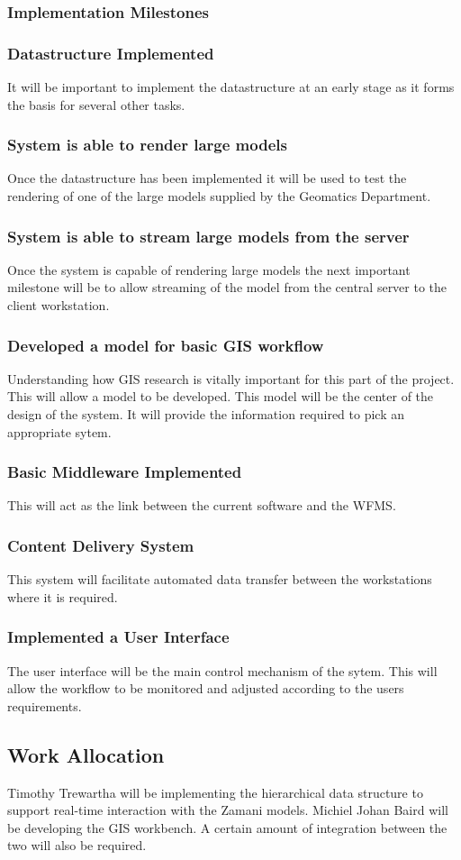 \documentclass[12pt,a4paper]{article}
\begin{document}
\subsubsection{Implementation Milestones}

\subsubsection*{Datastructure Implemented}
It will be important to implement the datastructure at an early stage as it
forms the basis for several other tasks.
\subsubsection*{System is able to render large models}
Once the datastructure has been implemented it will be used to test the
rendering of one of the large models supplied by the Geomatics Department.
\subsubsection*{System is able to stream large models from the server}
Once the system is capable of rendering large models the next important
milestone will be to allow streaming of the model from the central server to
the client workstation.
\subsubsection*{Developed a model for basic GIS workflow}
Understanding how GIS research is vitally important for this part of
the project. This will allow a model to be developed. This model will
be the center of the design of the system. It will provide the
information required to pick an appropriate sytem.
\subsubsection*{Basic Middleware Implemented}
This will act as the link between the current software and the WFMS.
\subsubsection*{Content Delivery System}
This system will facilitate automated data transfer between the workstations
where it is required.
\subsubsection*{Implemented a User Interface}
The user interface will be the main control mechanism of the sytem. This
will allow the workflow to be monitored and adjusted according to the users
requirements.

\subsection{Work Allocation}
Timothy Trewartha will be implementing the hierarchical data structure to support
real-time interaction with the Zamani models. Michiel Johan Baird will be developing
the GIS workbench. A certain amount of integration between the two will also be required.






\end{document}
